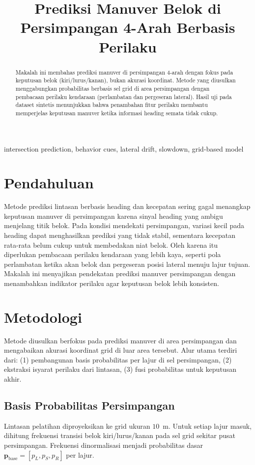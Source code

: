 \documentclass[conference]{IEEEtran}
\title{Prediksi Manuver Belok di Persimpangan 4-Arah Berbasis Perilaku}
\author{\IEEEauthorblockN{GridBaru Project}}
\date{}
\begin{document}
\maketitle

\begin{abstract}
Makalah ini membahas prediksi manuver di persimpangan 4-arah dengan fokus pada keputusan belok (kiri/lurus/kanan), bukan akurasi koordinat. Metode yang diusulkan menggabungkan probabilitas berbasis sel grid di area persimpangan dengan pembacaan perilaku kendaraan (perlambatan dan pergeseran lateral). Hasil uji pada dataset sintetis menunjukkan bahwa penambahan fitur perilaku membantu memperjelas keputusan manuver ketika informasi heading semata tidak cukup.
\end{abstract}

\begin{IEEEkeywords}
intersection prediction, behavior cues, lateral drift, slowdown, grid-based model
\end{IEEEkeywords}

\section{Pendahuluan}
Metode prediksi lintasan berbasis heading dan kecepatan sering gagal menangkap keputusan manuver di persimpangan karena sinyal heading yang ambigu menjelang titik belok. Pada kondisi mendekati persimpangan, variasi kecil pada heading dapat menghasilkan prediksi yang tidak stabil, sementara kecepatan rata-rata belum cukup untuk membedakan niat belok. Oleh karena itu diperlukan pembacaan perilaku kendaraan yang lebih kaya, seperti pola perlambatan ketika akan belok dan pergeseran posisi lateral menuju lajur tujuan. Makalah ini menyajikan pendekatan prediksi manuver persimpangan dengan menambahkan indikator perilaku agar keputusan belok lebih konsisten.

\section{Metodologi}
Metode diusulkan berfokus pada prediksi manuver di area persimpangan dan mengabaikan akurasi koordinat grid di luar area tersebut. Alur utama terdiri dari: (1) pembangunan basis probabilitas per lajur di sel persimpangan, (2) ekstraksi isyarat perilaku dari lintasan, (3) fusi probabilitas untuk keputusan akhir.

\subsection{Basis Probabilitas Persimpangan}
Lintasan pelatihan diproyeksikan ke grid ukuran $10$~m. Untuk setiap lajur masuk, dihitung frekuensi transisi belok kiri/lurus/kanan pada sel grid sekitar pusat persimpangan. Frekuensi dinormalisasi menjadi probabilitas dasar $\mathbf{p}_{\text{base}}=[p_L,p_S,p_R]$ per lajur.
\end{document}

